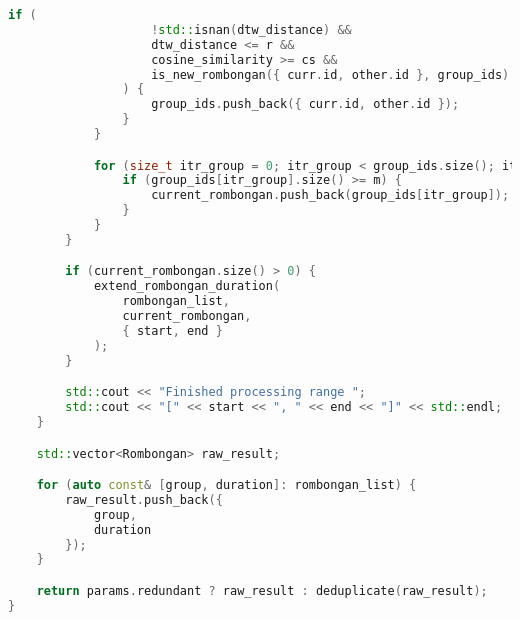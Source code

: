 \begin{lstlisting}[language=C++, caption=Implementasi fungsi \texttt{identify\_rombongan}, label={lamp:identify-rombongan}]
                if (
                    !std::isnan(dtw_distance) &&
                    dtw_distance <= r &&
                    cosine_similarity >= cs &&
                    is_new_rombongan({ curr.id, other.id }, group_ids)
                ) {
                    group_ids.push_back({ curr.id, other.id });
                }
            }

            for (size_t itr_group = 0; itr_group < group_ids.size(); itr_group++) {
                if (group_ids[itr_group].size() >= m) {
                    current_rombongan.push_back(group_ids[itr_group]);
                }
            }
        }

        if (current_rombongan.size() > 0) {
            extend_rombongan_duration(
                rombongan_list,
                current_rombongan,
                { start, end }
            );
        }

        std::cout << "Finished processing range ";
        std::cout << "[" << start << ", " << end << "]" << std::endl;
    }

    std::vector<Rombongan> raw_result;

    for (auto const& [group, duration]: rombongan_list) {
        raw_result.push_back({
            group,
            duration
        });
    }

    return params.redundant ? raw_result : deduplicate(raw_result);
}
\end{lstlisting}